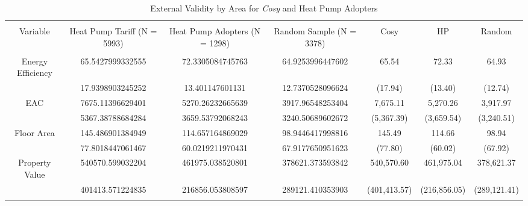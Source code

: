 
\begin{table}[!htbp] \centering 
  \caption{External Validity by Area for \textit{Cosy} and Heat Pump Adopters} 
  \label{tab:cosy-hp-random} 
\begin{tabular}{@{\extracolsep{5pt}} ccccccc} 
\\[-1.8ex]\hline 
\hline \\[-1.8ex] 
Variable & Heat Pump Tariff (N = 5993) & Heat Pump Adopters (N = 1298) & Random Sample (N = 3378) & Cosy & HP & Random \\ 
\hline \\[-1.8ex] 
Energy Efficiency & 65.5427999332555 & 72.3305084745763 & 64.9253996447602 & 65.54 & 72.33 & 64.93 \\ 
 & 17.9398903245252 & 13.401147601131 & 12.7370528096624 & (17.94) & (13.40) & (12.74) \\ 
EAC & 7675.11396629401 & 5270.26232665639 & 3917.96548253404 & 7,675.11 & 5,270.26 & 3,917.97 \\ 
 & 5367.38788684284 & 3659.53792068243 & 3240.50689602672 & (5,367.39) & (3,659.54) & (3,240.51) \\ 
Floor Area & 145.486901384949 & 114.657164869029 & 98.9446417998816 & 145.49 & 114.66 & 98.94 \\ 
 & 77.8018447061467 & 60.0219211970431 & 67.9177650951623 & (77.80) & (60.02) & (67.92) \\ 
Property Value & 540570.599032204 & 461975.038520801 & 378621.373593842 & 540,570.60 & 461,975.04 & 378,621.37 \\ 
 & 401413.571224835 & 216856.053808597 & 289121.410353903 & (401,413.57) & (216,856.05) & (289,121.41) \\ 
\hline \\[-1.8ex] 
\end{tabular} 
\end{table} 
